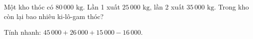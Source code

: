 \begin{ex} %
Một kho thóc có $80\,000\text{ kg}$. Lần 1 xuất $25\,000\text{ kg}$, lần 2 xuất $35\,000\text{ kg}$. Trong kho còn lại bao nhiêu ki-lô-gam thóc?
\end{ex}

\begin{ex} %
Tính nhanh: $45\,000 + 26\,000 + 15\,000 - 16\,000$.
\end{ex}
